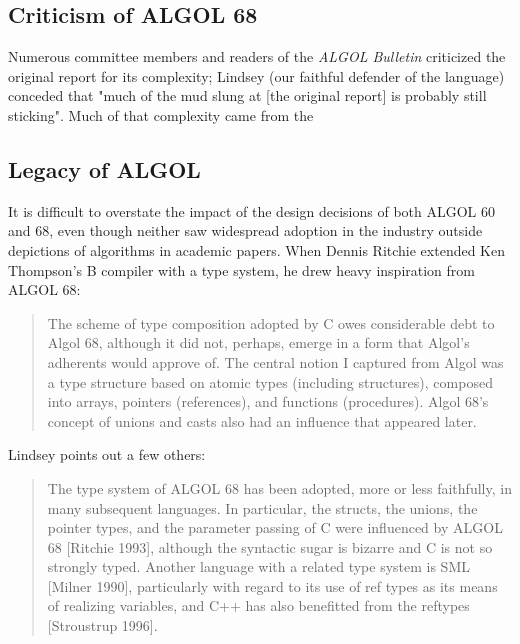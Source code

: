 \subsection{Criticism of ALGOL 68}

Numerous committee members and readers of the \textit{ALGOL Bulletin} criticized
the original report for its complexity; Lindsey (our faithful defender of the
language) conceded that "much of the mud slung at [the original report] is
probably still sticking"\cite{a_history_of_algol_68_1993}.
Much of that complexity came from the



\subsection{Legacy of ALGOL}

It is difficult to overstate the impact of the design decisions of both ALGOL 60 and 68,
even though neither saw widespread adoption in the industry outside depictions of
algorithms in academic papers.
When Dennis Ritchie extended Ken Thompson's B compiler with a type system, he drew heavy
inspiration from ALGOL 68:

\begin{quotation}
	The scheme of type composition adopted by C owes considerable debt to Algol 68,
	although it did not, perhaps, emerge in a form that Algol's adherents would
	approve of. The central notion I captured from Algol was a type structure based
	on atomic types (including structures), composed into arrays, pointers
	(references), and functions (procedures). Algol 68's concept of unions and
	casts also had an influence that appeared later.
	\cite{development_of_c_language_chist_ritchie_1996}
\end{quotation}

Lindsey points out a few others:

\begin{quotation}
	The type system of ALGOL 68 has been adopted, more or less faithfully, in many subsequent
	languages. In particular, the structs, the unions, the pointer types, and the parameter passing of C
	were influenced by ALGOL 68 [Ritchie 1993], although the syntactic sugar is bizarre and C is not so
	strongly typed. Another language with a related type system is SML [Milner 1990], particularly with
	regard to its use of ref types as its means of realizing variables, and C++ has also benefitted from the
	reftypes [Stroustrup 1996].
\end{quotation}

